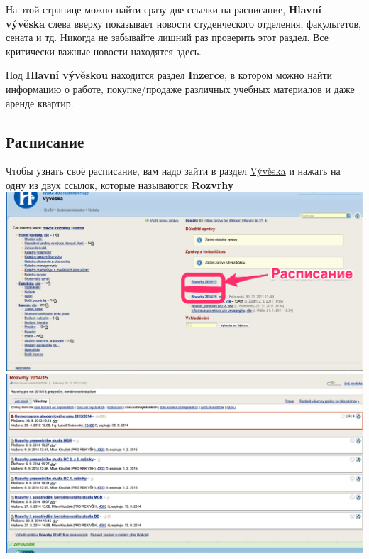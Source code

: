 \documentclass[a4paper,12pt]{article}
\begin{document}
На этой странице можно найти сразу две ссылки на расписание, \textbf{Hlavní vývěska} 
слева вверху показывает новости студенческого отделения, факультетов, сената и тд.
Никогда не забывайте лишний раз проверить этот раздел.
Все критически важные новости находятся здесь.

Под \textbf{Hlavní vývěskou} находится раздел \textbf{Inzerce}, в 
котором можно найти информацию о работе, 
покупке/продаже различных учебных материалов и даже аренде квартир.

\newpage

\subsection{Расписание}
Чтобы узнать своё расписание, вам надо зайти в раздел \href{https://is.vsh.cz/auth/vyveska/}{Vývěska}
и нажать на одну из двух ссылок, которые называются \textbf{Rozvrhy} \\

\includegraphics[width=\textwidth]{s13} \\

\includegraphics[width=\textwidth]{s14} \\

\newpage
\end{document}
